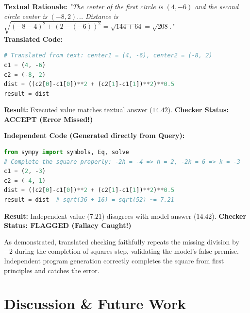 \documentclass[11pt,a4paper]{article}
\begin{document}
\begin{tcolorbox}[colback=red!5,colframe=red!60!black,title={Model Textual Rationale \& Translated Code (Circular Confirmation)}]
\textbf{Textual Rationale:} \textit{"The center of the first circle is $(4, -6)$ and the second circle center is $(-8, 2)$... Distance is $\sqrt{(-8-4)^2 + (2 - (-6))^2} = \sqrt{144 + 64} = \sqrt{208}$."}\\
\textbf{Translated Code:}
\begin{lstlisting}[language=Python]
# Translated from text: center1 = (4, -6), center2 = (-8, 2)
c1 = (4, -6)
c2 = (-8, 2)
dist = ((c2[0]-c1[0])**2 + (c2[1]-c1[1])**2)**0.5
result = dist
\end{lstlisting}
\textbf{Result:} Executed value matches textual answer ($14.42$). \textbf{Checker Status: ACCEPT (Error Missed!)}
\end{tcolorbox}

\begin{tcolorbox}[colback=green!5,colframe=green!60!black,title=Independent Program Verification (Correct Diagnosis)]
\textbf{Independent Code (Generated directly from Query):}
\begin{lstlisting}[language=Python]
from sympy import symbols, Eq, solve
# Complete the square properly: -2h = -4 => h = 2, -2k = 6 => k = -3
c1 = (2, -3)
c2 = (-4, 1)
dist = ((c2[0]-c1[0])**2 + (c2[1]-c1[1])**2)**0.5
result = dist  # sqrt(36 + 16) = sqrt(52) ~= 7.21
\end{lstlisting}
\textbf{Result:} Independent value ($7.21$) disagrees with model answer ($14.42$). \textbf{Checker Status: FLAGGED (Fallacy Caught!)}
\end{tcolorbox}

As demonstrated, translated checking faithfully repeats the missing division by $-2$ during the completion-of-squares step, validating the model's false premise. Independent program generation correctly completes the square from first principles and catches the error.

\section{Discussion \& Future Work}
\end{document}
